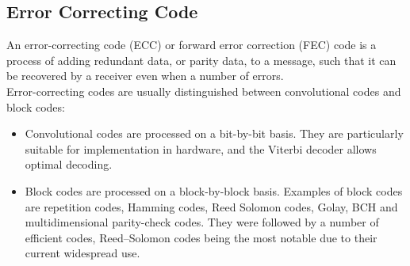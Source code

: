 \subsection{Error Correcting Code}
An error-correcting code (ECC) or forward error correction (FEC) code is a process of adding redundant data, or parity data, to a message, such that it can be recovered by a receiver even when a number of errors.\\
Error-correcting codes are usually distinguished between convolutional codes and block codes:
\begin{itemize}
    \item Convolutional codes are processed on a bit-by-bit basis. They are particularly suitable for implementation in hardware, and the Viterbi decoder allows optimal decoding.
    \item Block codes are processed on a block-by-block basis. Examples of block codes are repetition codes, Hamming codes, Reed Solomon codes, Golay, BCH and multidimensional parity-check codes. They were followed by a number of efficient codes, Reed–Solomon codes being the most notable due to their current widespread use.
\end{itemize}
%
%
